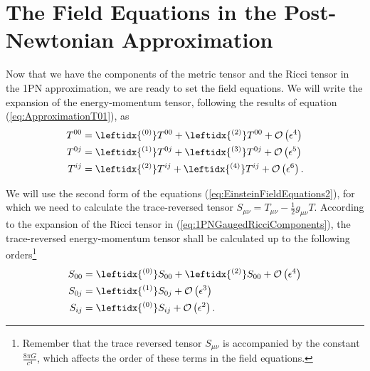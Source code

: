 \section{The Field Equations in the Post-Newtonian Approximation}
Now that we have the components of the metric tensor and the Ricci tensor in the 1PN approximation, we are ready to set the field equations. We will write the expansion of the energy-momentum tensor, following the results of equation (\ref{eq:ApproximationT01}), as
\begin{subequations}
\begin{align}
T^{00} &= \leftidx{ ^{(0)}} T^{00} + \leftidx{ ^{(2)}} T^{00} + \mathcal{O} \left( \epsilon^4 \right) \\
T^{0j} &= \leftidx{ ^{(1)}} T^{0j} + \leftidx{ ^{(3)}} T^{0j} + \mathcal{O} \left( \epsilon^5 \right) \\
T^{ij} &= \leftidx{ ^{(2)}} T^{ij} + \leftidx{ ^{(4)}} T^{ij} + \mathcal{O} \left( \epsilon^6 \right).
\end{align}
\end{subequations}

We will use the second form of the equations (\ref{eq:EinsteinFieldEquations2}), for which we need to calculate the trace-reversed tensor $S_{\mu \nu} = T_{\mu \nu} - \frac{1}{2} g_{\mu \nu} T $. According to the expansion of the Ricci tensor in (\ref{eq:1PNGaugedRicciComponents}), the trace-reversed energy-momentum tensor shall be calculated up to the following orders\footnote{Remember that the trace reversed tensor $S_{\mu \nu}$ is accompanied by the constant $\frac{8\pi G}{c^4}$, which affects the order of these terms in the field equations.}
\begin{subequations}
\begin{align}
S_{00} &= \leftidx{ ^{(0)}} S_{00} + \leftidx{ ^{(2)}} S_{00} + \mathcal{O} \left( \epsilon^4 \right) \\
S_{0j} &= \leftidx{ ^{(1)}} S_{0j}  + \mathcal{O} \left( \epsilon^3 \right) \\
S_{ij} &= \leftidx{ ^{(0)}} S_{ij} + \mathcal{O} \left( \epsilon^2 \right).
\end{align}
\end{subequations}

